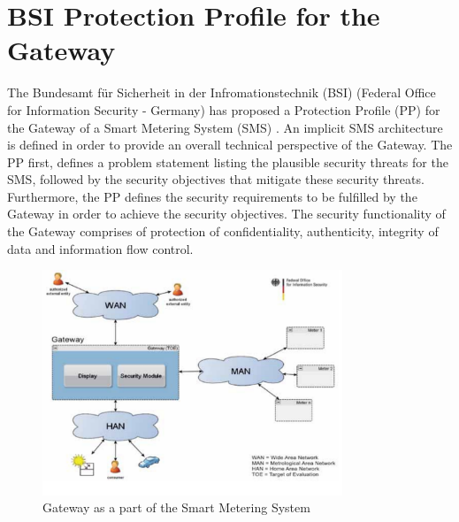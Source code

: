 \section{BSI Protection Profile for the Gateway}
The Bundesamt f\"ur Sicherheit in der Infromationstechnik (BSI) (Federal Office for Information Security - Germany) has proposed a Protection Profile (PP)  for the Gateway of a Smart Metering System (SMS) \cite{BSI_pp}. An implicit SMS architecture is defined in order to provide an overall technical perspective of the Gateway. The PP first, defines a problem statement listing the plausible security threats for the SMS, followed by the security objectives that mitigate these security threats. Furthermore, the PP defines the security requirements to be fulfilled by the Gateway in order to achieve the security objectives. The security functionality of the Gateway comprises of protection of confidentiality, authenticity, integrity of data and information flow control.

\begin{figure}[htb!]
\centering
\includegraphics[width=0.8\textwidth]{images/BSI_figure1}
\caption{Gateway as a part of the Smart Metering System \cite{BSI_pp}}
\label{fig:BSI_arch}
\end{figure}

